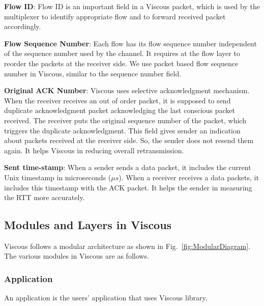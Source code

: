 \noindent  \textbf{Flow ID}: Flow ID is an important field in a Viscous packet, which is used by the multiplexer to identify appropriate flow and to forward received packet accordingly.
    
\noindent  \textbf{Flow Sequence Number}: Each flow has its flow sequence number independent of the sequence number used by the channel. It requires at the flow layer to reorder the packets at the receiver side. We use packet based flow sequence number in Viscous, similar to the sequence number field.
    
\noindent  \textbf{Original ACK Number}: Viscous uses selective acknowledgment mechanism. When the receiver receives an out of order packet, it is supposed to send duplicate acknowledgment packet acknowledging the last conscious packet received. The receiver puts the original sequence number of the packet, which triggers the duplicate acknowledgment. This field gives sender an indication about packets received at the receiver side. So, the sender does not resend them again. It helps Viscous in reducing overall retransmission.
    
    
\noindent  \textbf{Sent time-stamp}: When a sender sends a data packet, it includes the current Unix timestamp in microseconds ($\mu{s}$). When a receiver receives a data packets, it includes this timestamp with the ACK packet. It helps the sender in measuring the RTT more accurately.

\subsection{Modules and Layers in Viscous}
Viscous follows a modular architecture as shown in Fig.~\ref{fig:ModularDiagram}. The various modules in Viscous are as follows. 

\subsubsection{Application}
An application is the users' application that uses Viscous library. 


